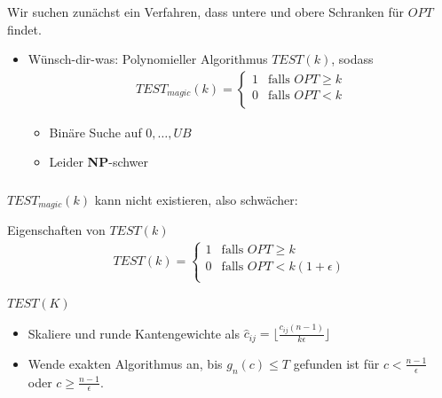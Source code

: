 \documentclass{beamer}
\begin{document}
\begin{frame}
   \frametitle{\insertsection}
   \framesubtitle{\insertsubsection}

   Wir suchen zunächst ein Verfahren, dass untere und obere Schranken für $OPT$
   findet.
   \begin{itemize}
      \item Wünsch-dir-was: Polynomieller Algorithmus $TEST(k)$, sodass
         \begin{align*}
            TEST_{magic}(k) = 
            \begin{cases}
               1 & \text{falls } OPT \ge k \\
               0 & \text{falls } OPT < k \\
            \end{cases} 
         \end{align*}
         \begin{itemize}
            \item Binäre Suche auf ${0,\ldots,UB}$ 
            \item Leider \textbf{NP}-schwer
         \end{itemize}
   \end{itemize}
\end{frame}

\begin{frame}
   \frametitle{\insertsection}
   \framesubtitle{\insertsubsection}

   $TEST_{magic}(k)$ kann nicht existieren, also schwächer:
   \begin{block}{Eigenschaften von $TEST(k)$}
      \begin{align*}
         TEST(k) = 
         \begin{cases}
            1 & \text{falls } OPT \ge k \\
            0 & \text{falls } OPT < k(1 + \epsilon) \\
         \end{cases} 
      \end{align*}
   \end{block}

   \begin{block}{$TEST(K)$}
      \begin{itemize}
         \item Skaliere und runde Kantengewichte als $\hat{c}_{ij} = \lfloor\frac{c_{ij} (n-1)}{k\epsilon}\rfloor$
         \item Wende exakten Algorithmus an, bis $g_n(c) \le T$ gefunden ist für $c < \frac{n-1}{\epsilon}$ oder $c \ge
            \frac{n-1}{\epsilon}$.
      \end{itemize}
   \end{block}

\end{frame}
\end{document}
